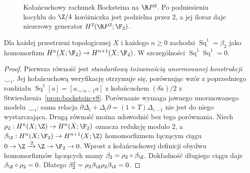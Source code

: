 \begin{figure}[!htbp]
\centering
{}
\caption{Kołańcuchowy rachunek Bocksteina na $\R P^2$.
Po podniesieniu kocyklu do $\Z/4$ koróżniczka
jest podzielna przez $2$, a jej iloraz daje niezerowy
generator $H^2(\R P^2;\F_2)$.}
\label{fig:bockstein-rp2-v8}
\end{figure}

\begin{twierdzenie}
\label{thm:sq1-bock-v8}
Dla każdej przestrzeni topologicznej $X$ i każdego $n\ge0$
zachodzi $\operatorname{Sq}^1=\beta_2$ jako homomorfizm
$H^n(X;\F_2)\to H^{n+1}(X;\F_2)$.
W szczególności $\operatorname{Sq}^1\operatorname{Sq}^1=0$.
\end{twierdzenie}
\begin{proof}
Pierwsza równość jest \emph{standardową tożsamością unormowanej
konstrukcji $\smile_i$}. Jej kołańcuchową weryfikację otrzymuje się,
porównując wzór z poprzedniego rozdziału
$\operatorname{Sq}^1[a]=[a\smile_{n-1}a]$
z kołańcuchem $(\delta\widetilde a)/2$ z
Stwierdzenia~\ref{prop:bockstein-v8}. Porównanie wymaga jawnego
unormowanego modelu $\smile_i$; sama relacja
$\partial\Delta_i+\Delta_i\partial=(1+T)\Delta_{i-1}$
nie jest do niego wystarczająca. Drugą równość można udowodnić bez tego porównania.
Niech $\rho_2:H^n(X;\Z)\to H^n(X;\F_2)$
oznacza redukcję modulo $2$, a
$\beta_{\Z}:H^n(X;\F_2)\to H^{n+1}(X;\Z)$
homomorfizmem łączącym ciągu
$0\to\Z\xrightarrow{\cdot2}\Z\to\F_2\to0$.
Wprost z kołańcuchowej definicji obydwu homomorfizmów
łączących mamy $\beta_2=\rho_2\circ\beta_{\Z}$.
Dokładność długiego ciągu daje
$\beta_{\Z}\circ\rho_2=0$. Dlatego
$\beta_2^2=\rho_2\beta_{\Z}\rho_2\beta_{\Z}=0$.
\end{proof}

